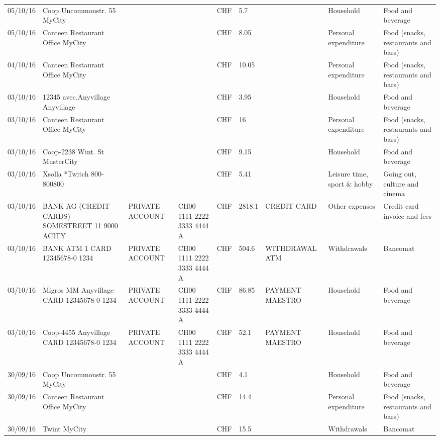 \begin{landscape}
\begin{table}[t]
\begin{center}
\begin{tabular}{lllllllll}
		05/10/16 & Coop Uncommonstr. 55   MyCity &       &       & CHF   & 5.7   &       & Household & Food and beverage \\
		05/10/16 & Canteen Restaurant Office      MyCity &       &       & CHF   & 8.05  &       & Personal expenditure & Food (snacks, restaurants and bars) \\
		04/10/16 & Canteen Restaurant Office      MyCity &       &       & CHF   & 10.05 &       & Personal expenditure & Food (snacks, restaurants and bars) \\
		03/10/16 & 12345 avec.Anyvillage   Anyvillage &       &       & CHF   & 3.95  &       & Household & Food and beverage \\
		03/10/16 & Canteen Restaurant Office      MyCity &       &       & CHF   & 16    &       & Personal expenditure & Food (snacks, restaurants and bars) \\
		03/10/16 & Coop-2238 Wint. St       MusterCity &       &       & CHF   & 9.15  &       & Household & Food and beverage \\
		03/10/16 & Xsolla *Twitch           800-800800 &       &       & CHF   & 5.41  &       & Leisure time, sport \& hobby & Going out, culture and cinema \\
		03/10/16 & BANK AG (CREDIT CARDS) SOMESTREET 11 9000 ACITY & PRIVATE ACCOUNT & CH00 1111 2222 3333 4444 A & CHF   & 2818.1 & CREDIT CARD & Other expenses & Credit card invoice and fees \\
		03/10/16 & BANK ATM 1 CARD 12345678-0 1234 & PRIVATE ACCOUNT & CH00 1111 2222 3333 4444 A & CHF   & 504.6 & WITHDRAWAL ATM & Withdrawals & Bancomat \\
		03/10/16 & Migros MM Anyvillage CARD 12345678-0 1234 & PRIVATE ACCOUNT & CH00 1111 2222 3333 4444 A & CHF   & 86.85 & PAYMENT MAESTRO & Household & Food and beverage \\
		03/10/16 & Coop-4455 Anyvillage CARD 12345678-0 1234 & PRIVATE ACCOUNT & CH00 1111 2222 3333 4444 A & CHF   & 52.1  & PAYMENT MAESTRO & Household & Food and beverage \\
		30/09/16 & Coop Uncommonstr. 55   MyCity &       &       & CHF   & 4.1   &       & Household & Food and beverage \\
		30/09/16 & Canteen Restaurant Office      MyCity &       &       & CHF   & 14.4  &       & Personal expenditure & Food (snacks, restaurants and bars) \\
		30/09/16 & Twint               MyCity &       &       & CHF   & 15.5  &       & Withdrawals & Bancomat \\

\end{tabular}
\end{center}
\end{table}
\end{landscape}
